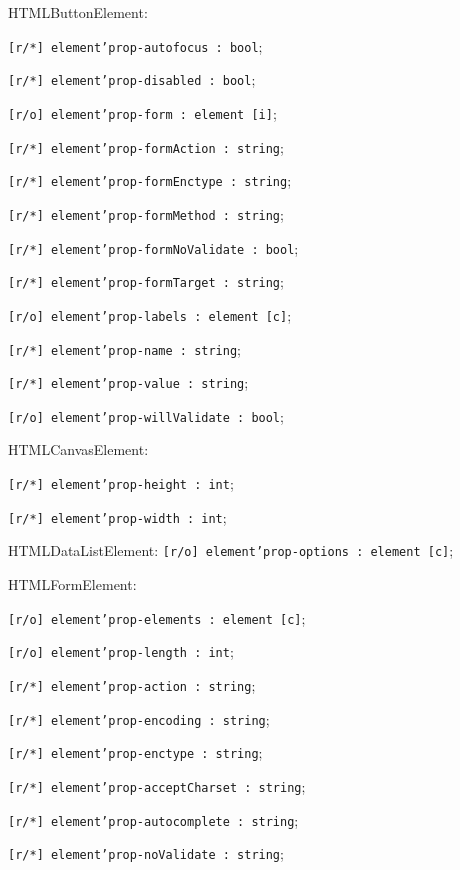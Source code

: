 \begin{icItems}
	\item HTMLButtonElement:
	\begin{icItems}
		\item \texttt{[r/*] element'prop-autofocus : bool};
		\item \texttt{[r/*] element'prop-disabled : bool};
		\item \texttt{[r/o] element'prop-form : element [i]};
		\item \texttt{[r/*] element'prop-formAction : string};
		\item \texttt{[r/*] element'prop-formEnctype : string};
		\item \texttt{[r/*] element'prop-formMethod : string};
		\item \texttt{[r/*] element'prop-formNoValidate : bool};
		\item \texttt{[r/*] element'prop-formTarget : string};
		\item \texttt{[r/o] element'prop-labels : element [c]};
		\item \texttt{[r/*] element'prop-name : string};
		\item \texttt{[r/*] element'prop-value : string};
		\item \texttt{[r/o] element'prop-willValidate  : bool};
	\end{icItems}
	
	\item HTMLCanvasElement:
	\begin{icItems}
		\item \texttt{[r/*] element'prop-height : int};
		\item \texttt{[r/*] element'prop-width : int};
	\end{icItems}
	
	\item HTMLDataListElement: \texttt{[r/o] element'prop-options : element [c]};
	
	\item HTMLFormElement:
	\begin{icItems}
		\item \texttt{[r/o] element'prop-elements : element [c]};
		\item \texttt{[r/o] element'prop-length : int};
		\item \texttt{[r/*] element'prop-action : string};
		\item \texttt{[r/*] element'prop-encoding : string};
		\item \texttt{[r/*] element'prop-enctype : string};
		\item \texttt{[r/*] element'prop-acceptCharset : string};
		\item \texttt{[r/*] element'prop-autocomplete : string};
		\item \texttt{[r/*] element'prop-noValidate : string};
	\end{icItems}
	

\end{icItems}
